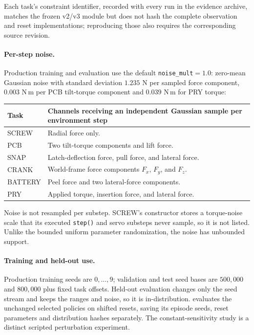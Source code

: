 \documentclass[10pt]{article}
\let\suppsection\suppname
\begin{document}
Each task's constraint identifier, recorded with every run in the evidence
archive, matches the frozen v2/v3 module but does not hash the complete
observation and reset implementations; reproducing those also requires the
corresponding source revision.

\paragraph{Per-step noise.}
Production training and evaluation use the default
\texttt{noise\_mult}${}=1.0$: zero-mean Gaussian noise with standard deviation
$1.235$ N per sampled force component, $0.003$ N\,m per PCB tilt-torque
component and $0.039$ N\,m for PRY torque:

\begin{center}
\small
\setlength{\tabcolsep}{5pt}
\begin{tabular}{@{}p{0.75in}p{5.25in}@{}}
\toprule
Task & Channels receiving an independent Gaussian sample per environment step\\
\midrule
SCREW & Radial force only.\\
PCB & Two tilt-torque components and lift force.\\
SNAP & Latch-deflection force, pull force, and lateral force.\\
CRANK & World-frame force components $F_x$, $F_y$, and $F_z$.\\
BATTERY & Peel force and two lateral-force components.\\
PRY & Applied torque, insertion force, and lateral force.\\
\bottomrule
\end{tabular}
\end{center}

Noise is not resampled per substep. SCREW's constructor stores a torque-noise
scale that its executed \texttt{step()} and servo substeps never sample, so it
is not listed. Unlike the bounded uniform parameter randomization, the noise
has unbounded support.

\paragraph{Training and held-out use.}
Production training seeds are $0,\ldots,9$; validation and test seed bases are
$500{,}000$ and $800{,}000$ plus fixed task offsets. Held-out evaluation
changes only the seed stream and keeps the ranges and noise, so it is in-distribution. \suppsection{S14} evaluates the unchanged selected policies
on shifted resets, saving its episode seeds, reset parameters and distribution
hashes separately. The constant-sensitivity study is a distinct scripted
perturbation experiment.
\end{document}
